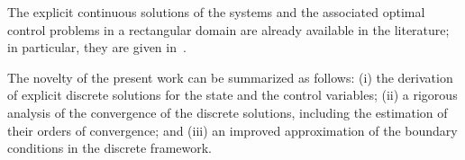 \documentclass[11pt]{article}
\begin{document}
 
{The explicit continuous solutions of the systems and the associated optimal control problems in a rectangular domain are already available in the literature; in particular, they are given in~\cite{BoGaTa2020}. 

The novelty of the present work can be summarized as follows: 
(i) the derivation of explicit discrete solutions for the state and the control variables; 
(ii) a rigorous analysis of the convergence of the discrete solutions, including the estimation of their orders of convergence; 
and (iii) an improved approximation of the boundary conditions in the discrete framework.}
% 
\end{document}
